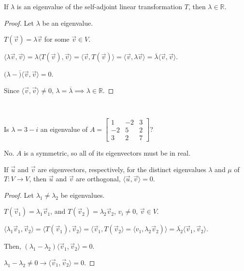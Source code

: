 \documentclass[11pt,fleqn]{book} %
\begin{document}
\setcounter{chapter}{5}
\setcounter{section}{3}
\setcounter{dummy}{9}
\begin{proposition}
    If $\lambda$ is an eigenvalue of the self-adjoint linear transformation $T$, then $\lambda \in \mathbb{R}$.
\end{proposition}
\setcounter{section}{5}
\setcounter{chapter}{3}

\begin{proof}
    Let $\lambda$ be an eigenvalue.

    $T(\vec{v}) = \lambda \vec{v}$ for some $\vec{v} \in V$.

    $\langle \lambda \vec{v}, \vec{v} \rangle = \lambda\langle T(\vec{v}), \vec{v} \rangle = \langle \vec{v}, T(\vec{v}) \rangle = \langle \vec{v}, \lambda \vec{v} \rangle = \overline{\lambda} \langle \vec{v}, \vec{v} \rangle$.

    $(\lambda - \overline) \langle \vec{v}, \vec{v} \rangle = 0$.

    Since $\langle \vec{v}, \vec{v} \rangle \neq 0$, $\lambda = \overline{\lambda} \implies \lambda \in \mathbb{R}$.
\end{proof}

\begin{example}
{~~~}

    Is $\lambda = 3-i$ an eigenvalue of $A = \begin{bmatrix} 1 &-2 &3 \\ -2 &5 &2 \\ 3 &2 &7 \end{bmatrix}$?

    { \color{lightblue} No. $A$ is a symmetric, so all of its eigenvectors must be in real. }
\end{example}

\setcounter{chapter}{5}
\setcounter{section}{3}
\begin{proposition}
    If $\vec{u}$ and $\vec{v}$ are eigenvectors, respectively, for the distinct eigenvalues $\lambda$ and $\mu$ of $T: V \to V$, then $\vec{u}$ and $\vec{v}$ are orthogonal, $\langle \vec{u}, \vec{v} \rangle = 0$.
\end{proposition}
\setcounter{section}{5}
\setcounter{chapter}{3}

\begin{proof}
    Let $\lambda_1 \neq \lambda_2$ be eigenvalues.

    $T(\vec{v}_1) = \lambda_1\vec{v}_1$, and $T(\vec{v}_2) = \lambda_2\vec{v}_2$, $v_i \neq 0$, $\vec{v} \in V$.

    $\langle \lambda_1\vec{v}_1, \vec{v}_2 \rangle = \langle T(\vec{v}_1), \vec{v}_2 \rangle = \langle \vec{v}_1, T(\vec{v}_2 \rangle = \langle v_1, \lambda_2\vec{v}_2) \rangle = \overline{\lambda_2}\langle \vec{v}_1, \vec{v}_2 \rangle$.

    Then, $(\lambda_1 - \lambda_2)\langle \vec{v}_1, \vec{v}_2 \rangle = 0$.

    $\lambda_1 - \lambda_2 \neq 0 \to \langle \vec{v}_1, \vec{v}_2 \rangle = 0$.
\end{proof}
\end{document}
